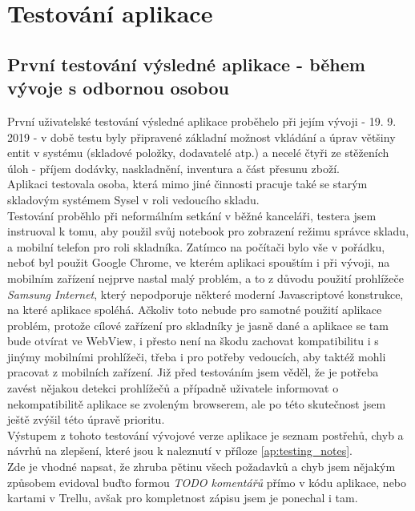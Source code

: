 \section{Testování aplikace}

\subsection{První testování výsledné aplikace - během vývoje s odbornou osobou}

První uživatelské testování výsledné aplikace proběhelo při jejím vývoji - 19. 9. 2019 - v době testu byly připravené základní možnost vkládání a úprav většiny entit v systému (skladové položky, dodavatelé atp.) a necelé čtyři ze stěženích úloh - příjem dodávky, naskladnění, inventura a část přesunu zboží.\\
Aplikaci testovala osoba, která mimo jiné činnosti pracuje také se starým skladovým systémem Sysel v roli vedoucího skladu.\\
Testování proběhlo při neformálním setkání v běžné kanceláři, testera jsem instruoval k tomu, aby použil svůj notebook pro zobrazení režimu správce skladu, a mobilní telefon pro roli skladníka. Zatímco na počítači bylo vše v pořádku, neboť byl použit Google Chrome, ve kterém aplikaci spouštím i při vývoji, na mobilním zařízení nejprve nastal malý problém, a to z důvodu použití prohlížeče \emph{Samsung Internet}, který nepodporuje některé moderní Javascriptové konstrukce, na které aplikace spoléhá. Ačkoliv toto nebude pro samotné použití aplikace problém, protože cílové zařízení pro skladníky je jasně dané a aplikace se tam bude otvírat ve WebView, i přesto není na škodu zachovat kompatibilitu i s jinýmy mobilními prohlížeči, třeba i pro potřeby vedoucích, aby taktéž mohli pracovat z mobilních zařízení. Již před testováním jsem věděl, že je potřeba zavést nějakou detekci prohlížečů a případně uživatele informovat o nekompatibilitě aplikace se zvoleným browserem, ale po této skutečnost jsem ještě zvýšil této úpravě prioritu.\\
Výstupem z tohoto testování vývojové verze aplikace je seznam postřehů, chyb a návrhů na zlepšení, které jsou k naleznutí v příloze \ref{ap:testing_notes}.\\
Zde je vhodné napsat, že zhruba pětinu všech požadavků a chyb jsem nějakým způsobem evidoval buďto formou \emph{TODO komentářů} přímo v kódu aplikace, nebo kartami v Trellu, avšak pro kompletnost zápisu jsem je ponechal i tam.
